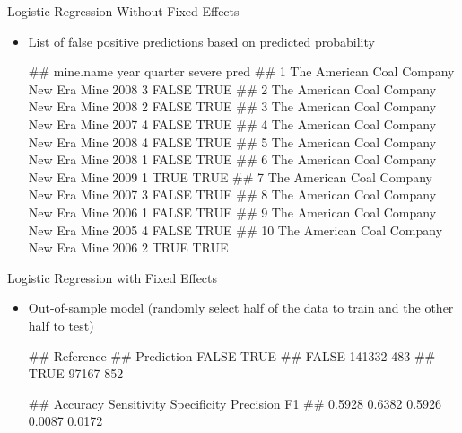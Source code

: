 \documentclass[]{beamer}
\providecommand{\tightlist}{%
  \setlength{\itemsep}{0pt}\setlength{\parskip}{0pt}}
\let\oldverbatim\verbatim
\let\endoldverbatim\endverbatim
\renewenvironment{verbatim}{\footnotesize\oldverbatim}{\endoldverbatim}
\begin{document}
\begin{frame}[fragile]{Logistic Regression Without Fixed Effects}

\begin{itemize}[<+->]
\tightlist
\item
  List of false positive predictions based on predicted probability 


\begin{verbatim}
##                                 mine.name year quarter severe pred
## 1  The American Coal Company New Era Mine 2008       3  FALSE TRUE
## 2  The American Coal Company New Era Mine 2008       2  FALSE TRUE
## 3  The American Coal Company New Era Mine 2007       4  FALSE TRUE
## 4  The American Coal Company New Era Mine 2008       4  FALSE TRUE
## 5  The American Coal Company New Era Mine 2008       1  FALSE TRUE
## 6  The American Coal Company New Era Mine 2009       1   TRUE TRUE
## 7  The American Coal Company New Era Mine 2007       3  FALSE TRUE
## 8  The American Coal Company New Era Mine 2006       1  FALSE TRUE
## 9  The American Coal Company New Era Mine 2005       4  FALSE TRUE
## 10 The American Coal Company New Era Mine 2006       2   TRUE TRUE
\end{verbatim}
\end{itemize}
\end{frame}

\begin{frame}[fragile]{Logistic Regression with Fixed Effects}

\begin{itemize}[<+->]
\tightlist
\item
  Out-of-sample model (randomly select half of the data to train and the
  other half to test)


\begin{verbatim}
##           Reference
## Prediction  FALSE   TRUE
##      FALSE 141332    483
##      TRUE   97167    852
\end{verbatim}

\begin{verbatim}
##    Accuracy Sensitivity Specificity   Precision          F1 
##      0.5928      0.6382      0.5926      0.0087      0.0172
\end{verbatim}
\end{itemize}
\end{frame}
\end{document}
